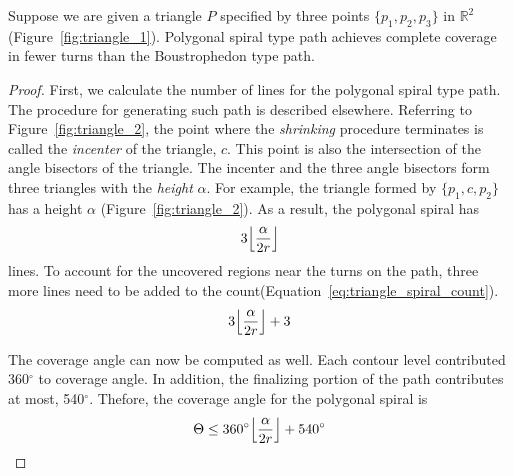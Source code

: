 \documentclass[../main.tex]{subfiles}
\begin{document}
\begin{theorem}
Suppose we are given a triangle $P$ specified by three points $\{p_1,p_2,p_3\}$ in $\mathbb{R}^2$(Figure~\ref{fig:triangle_1}). Polygonal spiral type path achieves complete coverage in fewer turns than the Boustrophedon type path.
\end{theorem}


\begin{proof}
First, we calculate the number of lines for the polygonal spiral type path. The procedure for generating such path is described elsewhere. Referring to Figure~\ref{fig:triangle_2}, the point where the \emph{shrinking} procedure terminates is called the \emph{incenter} of the triangle, $c$. This point is also the intersection of the angle bisectors of the triangle. The incenter and the three angle bisectors form three triangles with the \emph{height} $\alpha$. For example, the triangle formed by $\{p_1,c,p_2\}$ has a height $\alpha$ (Figure~\ref{fig:triangle_2}). As a result, the polygonal spiral has
\begin{equation}
	\begin{aligned}
	3\floor*{\frac{\alpha}{2r}}
	\end{aligned}
\end{equation}
lines. To account for the uncovered regions near the turns on the path, three more lines need to be added to the count(Equation~\ref{eq:triangle_spiral_count}).
\begin{equation}
\label{eq:triangle_spiral_count}
	\begin{aligned}
	3\floor*{\frac{\alpha}{2r}}+3
	\end{aligned}
\end{equation}

The coverage angle can now be computed as well. Each contour level contributed 360$^{\circ}$ to coverage angle. In addition, the finalizing portion of the path contributes at most, 540$^{\circ}$. Thefore, the coverage angle for the polygonal spiral is
\begin{equation}
\label{eq:triang_spiral_angle}
\begin{aligned}
	\Theta\leq360^{\circ}\floor*{\frac{\alpha}{2r}}+540^{\circ}
\end{aligned}
\end{equation}


\end{proof}
\end{document}
